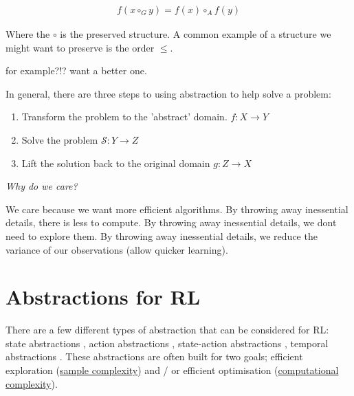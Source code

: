 \begin{align*}
f(x \circ_G y) = f(x) \circ_A f(y)
\end{align*}

Where the $\circ$ is the preserved structure. \footnotemark[19]
A common example of a structure we might want to preserve is the order $\le$.

{\color{red}for example?!? want a better one.}


In general, there are three steps to using abstraction to help solve a problem:

\begin{enumerate}
\tightlist
  \item Transform the problem to the 'abstract' domain. $f: X\to Y$
  \item Solve the problem $\mathcal S: Y \to Z$
  \item Lift the solution back to the original domain  $g:Z \to X$
\end{enumerate}


\begin{displayquote}
 \textit{Why do we care?}
\end{displayquote}

We care because we want more efficient algorithms.
By throwing away inessential details, there is less to compute.
By throwing away inessential details, we dont need to explore them.
By throwing away inessential details, we reduce the variance of our
observations (allow quicker learning).

%

\section{Abstractions for RL}


There are a few different types of abstraction that can be considered for RL:
state abstractions \cite{Anand2019, Littman2006,Haarnoja,Cuccu2018,Zhonga,Vezzani2019,Abel2018,Duan2018,Abel2017,Silver2016a},
action abstractions \cite{Chandak2019,Bester2019,Tennenholtz2019,Nagabandi2019}, state-action abstractions \cite{Dayan1993,Barreto2017}, temporal abstractions \cite{Christodoulou2019, Rafati,Mankowitz2018,Harutyunyan2017,Fruit2017,Riemer2018,Bacon2018,Achiam2018,Pham2019,Konidaris2018,Haarnoja,Sutton1999,Fruit2017a,Bacon2016a,Jinnai2018,Nachum2018}.
These abstractions are often built for two goals; efficient exploration
(\href{https://en.wikipedia.org/wiki/Sample_complexity}{sample complexity})
and / or efficient optimisation (\href{https://en.wikipedia.org/wiki/Computational_complexity_theory}{computational complexity}).

